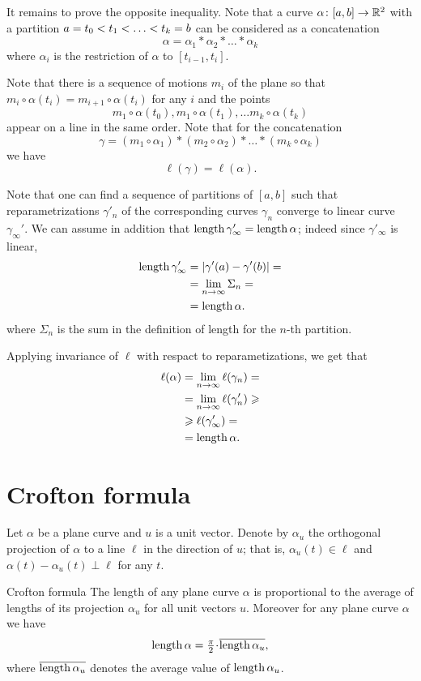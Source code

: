 It remains to prove the opposite inequality.
Note that a curve $\alpha\colon[a,b]\to \mathbb{R}^2$ with a partition $a=t_0\z<t_1\z<\z\dots\z<t_k=b$ can be considered as a concatenation
\[\alpha=\alpha_1*\alpha_2*\dots*\alpha_k\]
where $\alpha_i$ is the restriction of $\alpha$ to $[t_{i-1},t_i]$.

Note that there is a sequence of motions $m_i$ of the plane so that $m_i\circ\alpha(t_i)=m_{i+1}\circ\alpha(t_i)$ for any $i$ and 
the points 
\[m_1\circ\alpha(t_0), m_1\circ\alpha(t_1),\dots m_k\circ\alpha(t_k)\] 
appear on a line in the same order.
Note that for the concatenation 
\[\gamma=(m_1\circ\alpha_1)*(m_2\circ\alpha_2)*\dots*(m_k\circ\alpha_k)\]
we have
\[\ell(\gamma)=\ell(\alpha).\]

Note that one can find a sequence of partitions of $[a,b]$ such that reparametrizations $\gamma'_n$ of 
the corresponding curves $\gamma_n$ converge to linear curve $\gamma_\infty'$.
We can assume in addition that $\mathop{\rm length}\nolimits\gamma'_\infty=\mathop{\rm length}\nolimits\alpha$;
indeed since $\gamma'_\infty$ is linear,
\begin{align*}
\mathop{\rm length}\nolimits \gamma'_\infty&=|\gamma'(a)-\gamma'(b)|=
\\
&=\lim_{n\to\infty}\Sigma_n=
\\
&=\mathop{\rm length}\nolimits\alpha.
\end{align*}
where $\Sigma_n$ is the sum in the definition of length for the $n$-th partition.

Applying invariance of $\ell$ with respact to reparametizations, we get that
\begin{align*}
\ell(\alpha)&=\lim_{n\to\infty}\ell(\gamma_n)=
\\
&=\lim_{n\to\infty}\ell(\gamma_n')\geqslant
\\
&\geqslant \ell(\gamma_\infty')=
\\
&=\mathop{\rm length}\nolimits\alpha.
\end{align*}
\qedsf




\section{Crofton formula}

Let $\alpha$ be a plane curve and $u$ is a unit vector.
Denote by $\alpha_u$ the orthogonal projection of $\alpha$ to a line $\ell$ in the direction of $u$;
that is, $\alpha_u(t)\in\ell$ and $\alpha(t)-\alpha_u(t)\perp \ell$ for any $t$.

\begin{thm}{Crofton formula}
The length of any plane curve $\alpha$ is proportional to the average of lengths of its projection $\alpha_u$ for all unit vectors $u$.
Moreover for any plane curve $\alpha$ we have
\[\length\alpha=\tfrac\pi2\cdot\overline{\length \alpha_u},\]
where $\overline{\mathop{\rm length}\nolimits \alpha_u}$ denotes the average value of $\mathop{\rm length}\nolimits \alpha_u$.
\end{thm}

